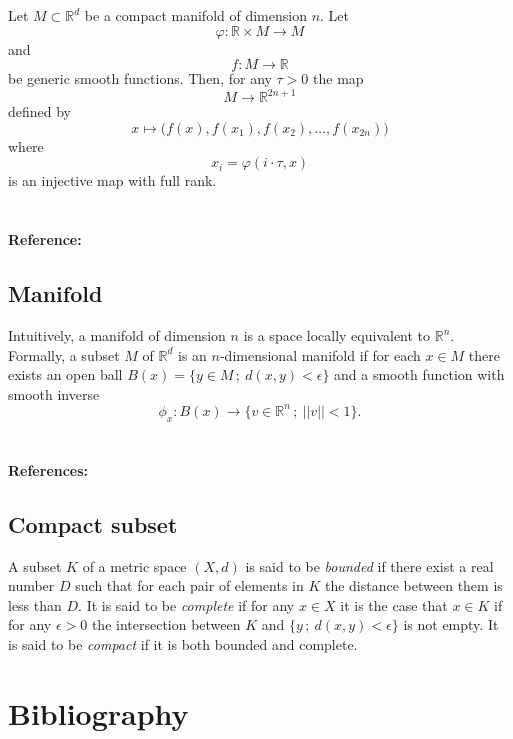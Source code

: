 \documentclass{amsart}
\begin{document}
	Let $M \subset \mathbb R^d$ be a 
	compact manifold of dimension $n$. Let
	\begin{equation*}
	\varphi : \mathbb R \times M \to M
	\end{equation*} 
	and
	\begin{equation*}
	f : M \to \mathbb R
	\end{equation*}
	be generic smooth functions. Then, for any $\tau > 0$ the map
	\begin{equation*}
	M \to \mathbb R^{2n+1}
	\end{equation*}
	defined by
	\begin{equation*}
	x \mapsto\big( f(x), f(x_1), f(x_2), \dots, f(x_{2n}) \big)
	\end{equation*}
	where 
	\begin{equation*}
	x_i = \varphi(i \cdot \tau, x)
	\end{equation*}
	is an injective map with full rank.
	
	\paragraph{\\ Reference:} \cite{takens1981detecting}
	
	\subsection*{Manifold} \label{manifold}
	
	Intuitively, a manifold of dimension $n$ is a space locally equivalent to $\mathbb R^n$. Formally, a subset $M$ of $\mathbb R^d$ is an $n$-dimensional manifold if for each $x \in M$ there exists an open ball $B(x) = \{ y \in M\,;\ d(x,y) < \epsilon\}$ and a smooth function with smooth inverse 
	\begin{equation*}
	\phi_x : B(x) \to \{v \in \mathbb R^n\,;\ ||v||<1\}.
	\end{equation*}
	
	\paragraph{\\ References:} \cite{milnor1997topology,guillemin2010differential}
	
	\subsection*{Compact subset}	\label{compact_subset}
	A subset $K$ of a metric space $(X,d)$ is said to be \textit{bounded} if there exist a real number $D$ such that for each pair of elements in $K$ the distance between them is less than $D$. It is said to be \textit{complete} if for any $x \in X$ it is the case that $x \in K$ if for any $\epsilon > 0$ the intersection between $K$ and $\{y \,;\ d(x,y) < \epsilon \}$ is not empty. It is said to be \textit{compact} if it is both bounded and complete.
	
	\section{Bibliography}
	{}
	
	
\end{document}
